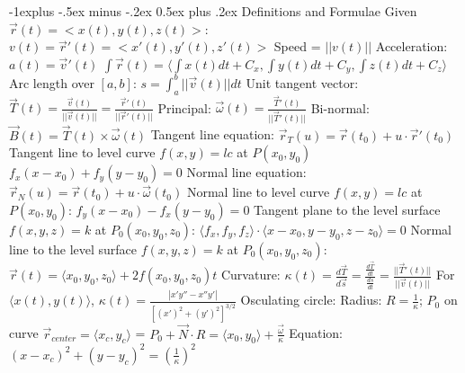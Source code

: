 \documentclass[8pt,landscape]{article}
\makeatletter
\renewcommand{\subsection}{\@startsection{subsection}{2}{0mm}%
                                {-1explus -.5ex minus -.2ex}%
                                {0.5ex plus .2ex}%
                                {\normalfont\normalsize\bfseries}}
\makeatother
\begin{document}
\begin{multicols*}{5}
\subsection{Definitions and Formulae}
Given $\vec{r}(t) = <x(t), y(t), z(t)>$:\newline
$v(t) = \vec{r}'(t) = <x'(t), y'(t), z'(t)>$\newline
Speed = $||v(t)||$\newline
Acceleration: $a(t) = \vec{v}'(t)$\newline
$\int \vec{r}(t) = \langle \int x(t) dt + C_x, \int y(t) dt + C_y, \int{z(t)} dt + C_z\rangle$\newline
Arc length over $[a, b]$: $s = \int_a^b ||\vec{v}(t)|| dt$\newline
Unit tangent vector: $\vec{T}(t) = \frac{\vec{v}(t)}{||\vec{v}(t)||} = \frac{\vec{r}'(t)}{||\vec{r}'(t)||}$\newline
Principal: $\vec{\omega}(t) = \frac{\vec{T}'(t)}{||\vec{T}'(t)||}$\newline
Bi-normal: $\vec{B}(t) = \vec{T}(t) \times \vec{\omega}(t)$\newline
Tangent line equation: $\vec{r}_T(u) = \vec{r}(t_0) + u \cdot \vec{r}'(t_0)$\newline
Tangent line to level curve $f(x, y) = lc$ at $P(x_0, y_0)$\newline
$f_x(x - x_0) + f_y(y - y_0) = 0$\newline
Normal line equation: $\vec{r}_N(u) = \vec{r}(t_0) + u \cdot \vec{\omega}(t_0)$\newline
Normal line to level curve $f(x, y) = lc$ at $P(x_0, y_0)$:\newline
$f_y(x - x_0) - f_x(y - y_0) = 0$\newline
Tangent plane to the level surface $f(x, y, z) = k$ at $P_0(x_0, y_0, z_0)$:\newline
$\langle f_x, f_y, f_z \rangle \cdot \langle x - x_0, y - y_0, z - z_0 \rangle = 0$\newline
Normal line to the level surface $f(x, y, z) = k$ at $P_0(x_0, y_0, z_0)$:\newline
$\vec{r}(t) = \langle x_0, y_0, z_0 \rangle + 2f (x_0, y_0, z_0)t$\newline
Curvature: $\kappa(t) = \frac{d\vec{T}}{d\vec{s}} = \frac{\frac{d\vec{T}}{dt}}{\frac{ds}{dt}} = \frac{||\vec{T}'(t)||}{||\vec{v}(t)||}$\newline
\hspace*{0.125cm} For $\langle x(t), y(t) \rangle$, $\kappa(t) = \frac{|x'y'' - x''y'|}{[(x')^2 + (y')^2]^{3/2}}$\newline
Osculating circle:\newline
\hspace*{0.125cm} Radius: $R = \frac{1}{\kappa}$; $P_0$ on curve\newline
\hspace*{0.125cm} $\vec{r}_{center} = \langle x_c, y_c \rangle$ = $P_0 + \vec{N} \cdot R = \langle x_0, y_0 \rangle + \frac{\vec{\omega}}{\kappa}$\newline
\hspace*{0.125cm} Equation: $(x - x_c)^2 + (y - y_c)^2 = (\frac{1}{\kappa})^2$


\end{multicols*}
\end{document}

